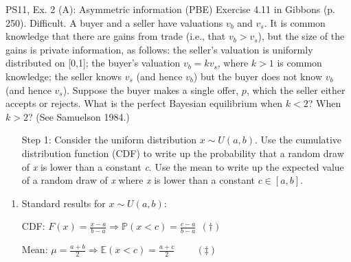 \begin{frame}{PS11, Ex. 2 (A): Asymmetric information (PBE)}
    Exercise 4.11 in Gibbons (p. 250). Difficult. A buyer and a seller have valuations $v_b$ and $v_s$. It is common knowledge that there are gains from trade (i.e., that $v_b > v_s$), but the size of the gains is private information, as follows: the seller’s valuation is uniformly distributed on [0,1]; the buyer’s valuation $v_b = kv_s$, where $k > 1$ is common knowledge; the seller knows $v_s$ (and hence $v_b$) but the buyer does not know $v_b$ (and hence $v_s$). Suppose the buyer makes a single offer, $p$, which the seller either accepts or rejects. What is the perfect Bayesian equilibrium when $k < 2$? When $k > 2$? (See Samuelson 1984.) \vspace{-8pt}
    \begin{multicols}{2}
      \begin{itemize}
        \item[Step 1:] Consider the uniform distribution $x\sim U(a, b)$. Use the cumulative distribution function (CDF) to write up the probability that a random draw of \textit{x} is lower than a constant \textit{c}. Use the mean to write up the expected value of a random draw of \textit{x} where \textit{x} is lower than a constant $c\in[a,b]$.
      \end{itemize}
      \vfill\null\columnbreak
      \begin{enumerate}
        \item Standard results for $x\sim U(a, b):$
        \item[CDF:] $F(x)=\frac{x-a}{b-a}\Rightarrow\mathbb{P}(x<c)=\frac{c-a}{b-a}\ \ (\dagger)$
        \item[Mean:] $\mu=\frac{a+b}{2}\Rightarrow\mathbb{E}(x<c)=\frac{a+c}{2}\quad\quad\ (\ddagger)$
      \end{enumerate}
      \vfill\null
    \end{multicols}
\end{frame}
